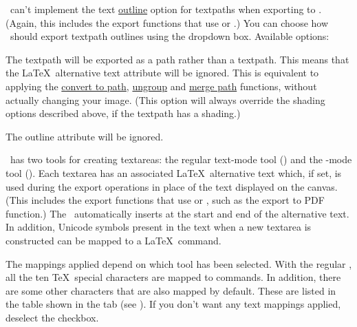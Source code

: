 
\FlowframTk\ can't implement the text
\hyperref[sec:textoutline]{outline} option for
\glspl{textpath} when exporting to . (Again, this
includes the export functions that use  or .)
You can choose how \FlowframTk\ should export \gls{textpath}
outlines using the 
dropdown box. Available options:

\begin{deflist}
\itemtitle
 {}

\begin{itemdesc}
The \gls{textpath} will be exported as a path rather than a
\gls{textpath}. This means that the \LaTeX\
alternative text attribute will be ignored. This is equivalent to
applying the
\hyperref[sec:converttopath]{convert to path}, 
\hyperref[sec:grouping]{ungroup} and 
\hyperref[sec:mergepaths]{merge path}
functions, without actually changing your image.
(This option will always override the shading options described
above, if the \gls{textpath} has a shading.)
\end{itemdesc}

\itemtitle
 {}

\begin{itemdesc}
The outline attribute will be ignored.
\end{itemdesc}

\end{deflist}

%
%
\FlowframTk\ has two tools for creating \glspl{textarea}: the
regular text-mode tool () and the
-mode tool (). Each \gls{textarea} has an
associated \LaTeX\ alternative text which, if set, is used
during the  export operations in place of the
text displayed on the \gls{canvas}. (This includes the export
functions that use  or , such as
the export to PDF function.) The \mathstool\ automatically
inserts  at the start and end of the
alternative text. In addition, Unicode symbols present in
the text when a new \gls*{textarea} is constructed can be mapped to
a \LaTeX\ command.

The mappings applied depend on which tool has been selected. With
the regular \texttool, all the ten \TeX\ special characters are
mapped to commands. In addition, there are some other characters
that are also mapped by default. These are listed in the table shown
in the \widget{textconfig.textmode} tab (see
). If you don't want any
text mappings applied, deselect the
 \gls{checkbox}.

